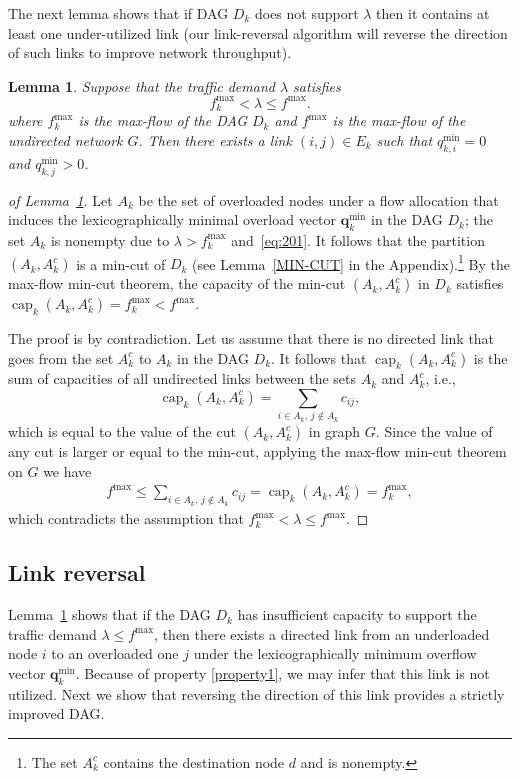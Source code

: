 \documentclass{sig-alternate-2013}
\newtheorem{lemma}{Lemma}
\newcommand{\capp}{\operatorname{cap}}
\begin{document}
The next lemma shows that if DAG $D_k$  does not support $\lambda$ then it contains at least one  under-utilized link (our link-reversal algorithm will reverse the direction of such links to improve network throughput).
\begin{lemma}\label{lem: backward link}
Suppose that the traffic demand $\lambda$ satisfies
\[
f^{\max}_{k}<\lambda\leq f^{\max}.
\]
where $f^{\max}_{k}$ is the max-flow of the DAG $D_{k}$ and $f^{\max}$ is the max-flow of the undirected network $G$.
Then 
there exists a link $(i, j)\in E_{k}$ such that $q_{k,i}^{\text{min}}=0$ and $q_{k,j}^{\text{min}}>0$.
\end{lemma}

\begin{proof}[of Lemma~\ref{lem: backward link}]
Let $A_{k}$ be the set of overloaded nodes  under a flow allocation that induces the lexicographically minimal overload vector ${\bm q}^{\min}_{k}$ in the DAG $D_{k}$; the set $A_{k}$ is nonempty due to $\lambda > f^{\max}_{k}$ and~\eqref{eq:201}. It follows that the partition $(A_{k}, A_{k}^{c})$ is a min-cut of $D_{k}$ (see Lemma~\ref{MIN-CUT} in the Appendix).\footnote{The set $A_{k}^{c}$ contains the destination node $d$ and is nonempty.} By the max-flow min-cut theorem, the capacity of the min-cut $(A_{k}, A_{k}^{c})$ in $D_{k}$ satisfies $\capp_k(A_{k}, A_{k}^c) =  f^{\max}_k < f^{\max}$.

The proof is by contradiction. Let us assume that there is no directed link that goes from the set $A_{k}^c$ to $A_{k}$ in the DAG $D_k$. It follows that $\capp_k(A_{k}, A_{k}^c)$ is the sum of capacities of all undirected links between the sets $A_{k}$ and $A_{k}^c$, i.e., 
\[
\capp_k(A_{k}, A_{k}^{c}) = \sum_{i\in A_{k},\, j\notin A_{k}} c_{ij},
\]
which is equal to the value of the cut $(A_k,A_k^c)$ in graph $G$.
Since the value of any cut is larger or equal to the min-cut, applying the max-flow min-cut theorem on $G$ we have
\begin{align*}
f^{\max} \leq  \sum_{i\in A_{k},\, j\notin A_{k}} c_{ij} =
\capp_k(A_{k}, A_{k}^{c}) = f_{k}^{\text{max}},
\end{align*}
which contradicts the assumption that $f_{k}^{\max} < \lambda \leq f^{\max}$.
\end{proof}


\subsection{Link reversal}

Lemma~\ref{lem: backward link} shows that if the DAG $D_{k}$ has insufficient capacity to support the traffic demand $\lambda \leq f^{\max}$, then there exists a directed link from an underloaded node $i$ to an overloaded one $j$ under the lexicographically minimum overflow vector $\bm{q}_{k}^{\text{min}}$. 
Because of property \eqref{property1}, we may infer that this link is not utilized. Next we show that reversing the direction of this link provides a strictly improved DAG.
\end{document}

